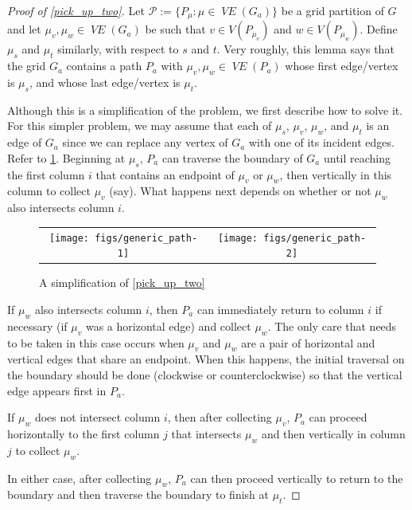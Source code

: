 \documentclass{patmorin}
\DeclareMathOperator{\VE}{\mathit{VE}}
\begin{document}
\begin{proof}[Proof of \cref{pick_up_two}]
  Let $\mathcal{P}:=\{P_\mu:\mu\in \VE(G_a)\}$ be a grid partition of $G$ and let $\mu_v,\mu_w\in \VE(G_a)$ be such that $v\in V(P_{\mu_v})$ and $w\in V(P_{\mu_w})$.  Define $\mu_s$ and $\mu_t$ similarly, with respect to $s$ and $t$.  Very roughly, this lemma says that the grid $G_a$ contains a path $P_a$ with $\mu_v,\mu_w\in\VE(P_a)$ whose first edge/vertex is $\mu_s$, and whose last edge/vertex is $\mu_t$.

  Although this is a simplification of the problem, we first describe how to solve it.  For this simpler problem, we may assume that each of $\mu_s$, $\mu_v$, $\mu_w$, and $\mu_t$ is an edge of $G_a$ since we can replace any vertex of $G_a$ with one of its incident edges. Refer to \cref{generic_path}. Beginning at $\mu_s$, $P_a$ can traverse the boundary of $G_a$ until reaching the first column $i$ that contains an endpoint of $\mu_v$ or $\mu_w$, then vertically in this column to collect $\mu_v$ (say). What happens next depends on whether or not $\mu_w$ also intersects column $i$.
  \begin{figure}[htbp]
    \begin{center}
      \begin{tabular}{cc}
        \texttt{[image: figs/generic\_path-1]} &
        \texttt{[image: figs/generic\_path-2]}
      \end{tabular}
    \end{center}
    \caption{A simplification of \cref{pick_up_two}}
    \label{generic_path}
  \end{figure}
  \begin{compactitem}
    \item If $\mu_w$ also intersects column $i$, then $P_a$ can immediately return to column $i$ if necessary (if $\mu_v$ was a horizontal edge) and collect $\mu_w$. The only care that needs to be taken in this case occurs when $\mu_v$ and $\mu_w$ are a pair of horizontal and vertical edges that share an endpoint.  When this happens, the initial traversal on the boundary should be done (clockwise or counterclockwise) so that the vertical edge appears first in $P_a$.

    \item If $\mu_w$ does not intersect column $i$, then after collecting $\mu_v$, $P_a$ can proceed horizontally to the first column $j$ that intersects $\mu_w$ and then vertically in column $j$ to collect $\mu_w$.
  \end{compactitem}
  In either case, after collecting $\mu_w$, $P_a$ can then proceed vertically to return to the boundary and then traverse the boundary to finish at $\mu_t$.


\end{proof}
\end{document}
